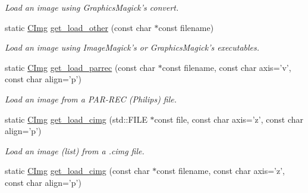 \begin{DoxyCompactItemize}
\begin{DoxyCompactList}\small\item\em Load an image using Graphics\-Magick's convert. \end{DoxyCompactList}\item 
\hypertarget{structcimg__library_1_1_c_img_aa6f1fd75110bfd31c1ac72f912997b7a}{static \hyperlink{structcimg__library_1_1_c_img}{C\-Img} \hyperlink{structcimg__library_1_1_c_img_aa6f1fd75110bfd31c1ac72f912997b7a}{get\-\_\-load\-\_\-other} (const char $\ast$const filename)}\label{structcimg__library_1_1_c_img_aa6f1fd75110bfd31c1ac72f912997b7a}

\begin{DoxyCompactList}\small\item\em Load an image using Image\-Magick's or Graphics\-Magick's executables. \end{DoxyCompactList}\item 
\hypertarget{structcimg__library_1_1_c_img_a12e84cc6197e2cc8a28cfdd3de7bc238}{static \hyperlink{structcimg__library_1_1_c_img}{C\-Img} \hyperlink{structcimg__library_1_1_c_img_a12e84cc6197e2cc8a28cfdd3de7bc238}{get\-\_\-load\-\_\-parrec} (const char $\ast$const filename, const char axis='v', const char align='p')}\label{structcimg__library_1_1_c_img_a12e84cc6197e2cc8a28cfdd3de7bc238}

\begin{DoxyCompactList}\small\item\em Load an image from a P\-A\-R-\/\-R\-E\-C (Philips) file. \end{DoxyCompactList}\item 
\hypertarget{structcimg__library_1_1_c_img_a3f14ad09d583c62463956de444a7f310}{static \hyperlink{structcimg__library_1_1_c_img}{C\-Img} \hyperlink{structcimg__library_1_1_c_img_a3f14ad09d583c62463956de444a7f310}{get\-\_\-load\-\_\-cimg} (std\-::\-F\-I\-L\-E $\ast$const file, const char axis='z', const char align='p')}\label{structcimg__library_1_1_c_img_a3f14ad09d583c62463956de444a7f310}

\begin{DoxyCompactList}\small\item\em Load an image (list) from a .cimg file. \end{DoxyCompactList}\item 
\hypertarget{structcimg__library_1_1_c_img_acd4f2cd67859de1223d94d249958be71}{static \hyperlink{structcimg__library_1_1_c_img}{C\-Img} \hyperlink{structcimg__library_1_1_c_img_acd4f2cd67859de1223d94d249958be71}{get\-\_\-load\-\_\-cimg} (const char $\ast$const filename, const char axis='z', const char align='p')}\label{structcimg__library_1_1_c_img_acd4f2cd67859de1223d94d249958be71}


\end{DoxyCompactItemize}
